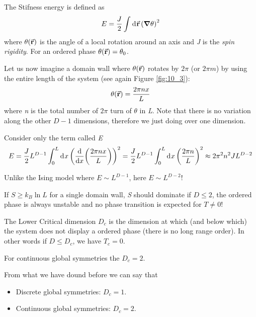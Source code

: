 \documentclass[../main/main.tex]{subfiles}
\begin{document}
\begin{definition}
  The Stifness energy is defined as
  \begin{equation}
    E = \frac{J}{2} \int_{}^{} \dd[]{\va{r}} \qty(\grad \theta )^2
  \end{equation}
where \( \theta (\va{r})  \) is the angle of a local rotation around an axis and \emph{J} is the \emph{spin rigidity}. For an ordered phase \( \theta (\va{r}) = \theta _0 \).
\end{definition}
Let us now imagine a domain wall where \(\theta (\va{r})  \)  rotates by \( 2 \pi  \) (or \( 2 \pi m \)) by using the entire length of the system (see again Figure \ref{fig:10_3}):
\begin{equation}
  \theta (\va{r}) = \frac{2 \pi n x}{L}
\end{equation}
where \emph{n} is the total number of \( 2 \pi  \) turn of \( \theta  \) in \emph{L}. Note that there is no variation along the other \( D-1 \) dimensions, therefore we just doing over one dimension.

 Consider only the term called \emph{E}
 \begin{equation}
   E = \frac{J}{2} L^{D-1} \int_{0}^{L} \dd[]{x} \qty(\dv{}{x} \qty(\frac{2 \pi n x}{L})  )^2 = \frac{J}{2} L^{D-1} \int_{0}^{L} \dd[]{x} \qty(\frac{2 \pi n}{L})^2 \approx 2 \pi ^2 n^2 J L^{D-2}
 \end{equation}
\begin{remark}
Unlike the Ising model where \( E \sim L^{D-1} \), here \( E \sim L^{D-2} \)!

If \( S \ge k_B \ln{L}  \) for a single domain wall, \emph{S} should dominate if \( D \le 2 \), the ordered phase is always unstable and no phase transition is expected for \( T \neq 0 \)!
\end{remark}

\begin{definition}
  The Lower Critical dimension \( D_c \) is the dimension at which (and below which) the system does not display a ordered phase (there is no long range order).
  In other words if \( D \le D_c \), we have \( T_c = 0 \).
\end{definition}
\begin{theorem}
  For continuous global symmetries the \( D_c =2 \).
\end{theorem}

 From what we have dound before we can say that
\begin{itemize}
\item Discrete global symmetries: \( D_c =1 \).
\item Continuous global symmetries: \( D_c =2 \).
\end{itemize}
\end{document}
